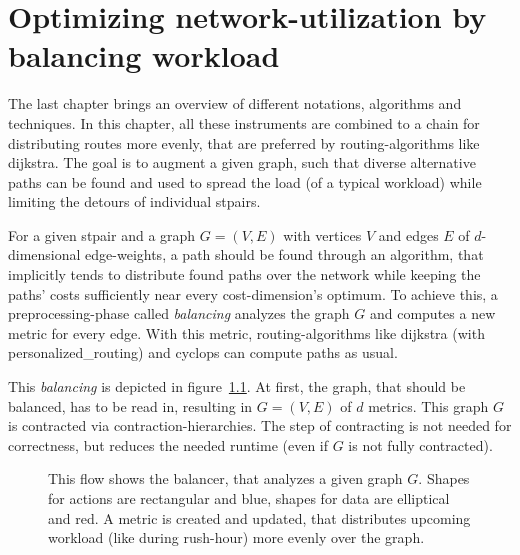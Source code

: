 \chapter{Optimizing network-utilization by balancing workload}
\label{chap:balancing}


The last chapter brings an overview of different notations, algorithms and techniques.
In this chapter, all these instruments are combined to a chain for distributing routes more evenly, that are preferred by routing-algorithms like \gls{dijkstra}.
The goal is to augment a given graph, such that diverse alternative paths can be found and used to spread the load (of a typical workload) while limiting the detours of individual \glspl{stpair}.

For a given \gls{stpair} and a graph $G = (V, E)$ with vertices $V$ and edges $E$ of $d$-dimensional edge-weights, a path should be found through an algorithm, that implicitly tends to distribute found paths over the network while keeping the paths' costs sufficiently near every cost-dimension's optimum.
To achieve this, a preprocessing-phase called \textit{balancing} analyzes the graph $G$ and computes a new metric for every edge.
With this metric, routing-algorithms like \gls{dijkstra}  (with \gls{personalized_routing}) and \gls{cyclops} can compute paths as usual.

This \textit{balancing} is depicted in figure~\ref{fig:balancing}.
At first, the graph, that should be balanced, has to be read in, resulting in $G = (V, E)$ of $d$ metrics.
This graph $G$ is contracted via \gls{contraction-hierarchies}.
The step of contracting is not needed for correctness, but reduces the needed runtime (even if $G$ is not fully contracted).


\begin{figure}
    \centering
    
    \caption[Overview of balancing a graph]{%
        This flow shows the balancer, that analyzes a given graph $G$.
        Shapes for actions are rectangular and blue, shapes for data are elliptical and red.
        A metric is created and updated, that distributes upcoming workload (like during rush-hour) more evenly over the graph.
        \label{fig:balancing}
    }
\end{figure}

